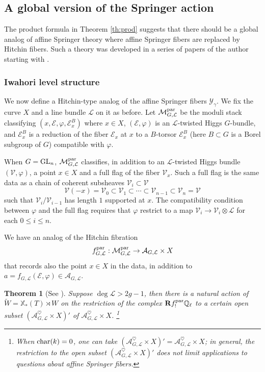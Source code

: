 \documentclass[]{pcmi}
\let\oldsubsubsection\subsubsection
\renewcommand{\subsubsection}[1]{%
\setcounter{subsubsection}{\value{equation}}%
\oldsubsubsection{#1}%
\refstepcounter{equation}%
}
\theoremstyle{plain}
\newtheorem{theorem}[equation]{Theorem}
\theoremstyle{definition}
\def\QQ{\mathbb{Q}}
\def\calA{\mathcal{A}}
\def\calE{\mathcal{E}}
\def\calL{\mathcal{L}}
\def\calM{\mathcal{M}}
\def\calV{\mathcal{V}}
\newcommand{\sY}{\ensuremath{\mathscr{Y}}\xspace}
\newcommand{\sY}{\ensuremath{\mathcal{Y}}\xspace}
\def\bR{\mathbf{R}}
\newcommand\tilW{\widetilde{W}}
\newcommand\GL{\textup{GL}}
\newcommand\xcoch{\mathbb{X}_*}
\newcommand{\Ql}{\QQ_{\ell}}
\newcommand{\Ah}{\calA^{\heartsuit}}
\newcommand{\Mpar}{\calM^{\textup{par}}}
\newcommand{\fpar}{f^{\textup{par}}}
\begin{document}
\subsection{A global version of the Springer action}

The product formula in Theorem \ref{th:prod} suggests that there should be a global analog of affine Springer theory where affine Springer fibers are replaced by Hitchin fibers. Such a theory was developed in a series of papers of the author starting with \cite{GS}.

\subsubsection{Iwahori level structure} We now define a Hitchin-type analog of the affine Springer fibers $\sY_{\gamma}$. We fix the curve $X$ and a line bundle $\calL$ on it as before. Let $\Mpar_{G,\calL}$ be the moduli stack classifying $(x,\calE,\varphi, \calE^{B}_{x})$ where $x\in X$, $(\calE,\varphi)$ is an $\calL$-twisted Higgs $G$-bundle, and $\calE^{B}_{x}$ is a reduction of the fiber $\calE_{x}$ at $x$ to a $B$-torsor $\calE^{B}_{x}$ (here $B\subset G$ is a Borel subgroup of $G$) compatible with $\varphi$. 

When $G=\GL_{n}$, $\Mpar_{G,\calL}$ classifies, in addition to an $\calL$-twisted Higgs bundle $(\calV,\varphi)$, a point $x\in X$ and a full flag of the fiber $\calV_{x}$. Such a full flag is the same data as a chain of coherent subsheaves $\calV_{i}\subset\calV$
\begin{equation*}
\calV(-x)=\calV_{0}\subset \calV_{1}\subset\cdots\subset\calV_{n-1}\subset\calV_{n}=\calV
\end{equation*}
such that $\calV_{i}/\calV_{i-1}$ has length $1$ supported at $x$. The compatibility condition between $\varphi$ and the full flag requires that $\varphi$ restrict to a map $\calV_{i}\to\calV_{i}\otimes\calL$ for each $0\leq i\leq n$. 

We have an analog of the Hitchin fibration
\begin{equation*}
\fpar_{G,\calL}:\Mpar_{G,\calL}\to \calA_{G,\calL}\times X
\end{equation*}
that records also the point $x\in X$ in the data, in addition to $a=f_{G,\calL}(\calE,\varphi)\in\calA_{G,\calL}$.

\begin{theorem}[See {\cite[Th 3.3.3]{GS}}]\label{th:GS} Suppose $\deg\calL>2g-1$, then there is a natural action of $\tilW=\xcoch(T)\rtimes W$ on the restriction of the complex $\bR\fpar_{!}\Ql$ to a certain open subset $(\Ah_{G,\calL}\times X)'$ of $\Ah_{G,\calL}\times X$. \footnote{When $\textup{char}(k)=0$, one can take $(\Ah_{G,\calL}\times X)'=\Ah_{G,\calL}\times X$; in general, the restriction to the open subset $(\Ah_{G,\calL}\times X)'$ does not limit applications to questions about affine Springer fibers.}
\end{theorem}
\end{document}
